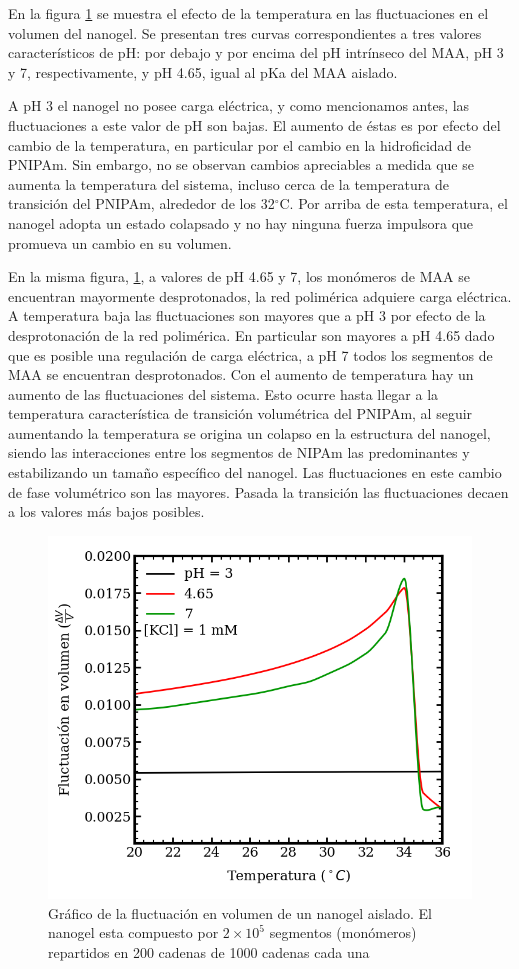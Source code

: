 	
	En la figura \ref{fig:mc:fluct-T} se muestra el efecto de la temperatura en las fluctuaciones en el volumen del nanogel. Se presentan tres curvas correspondientes a tres valores caracter\'isticos de pH: por debajo y por encima del pH intr\'inseco del MAA, pH 3 y 7, respectivamente, y pH 4.65, igual al pKa del MAA aislado.
	
	A pH 3 el nanogel no posee carga el\'ectrica, y como mencionamos antes, las fluctuaciones a este valor de pH son bajas. El aumento de \'estas es por efecto del cambio de la temperatura, en particular por el cambio en la hidroficidad de PNIPAm. Sin embargo, no se observan cambios apreciables a medida que se aumenta la temperatura del sistema, incluso cerca de la temperatura de transici\'on del PNIPAm, alrededor de los 32$^\circ$C. Por arriba de esta temperatura, el nanogel adopta un estado colapsado y no hay ninguna fuerza impulsora que promueva un cambio en su volumen.
	
	En la misma figura, \ref{fig:mc:fluct-T}, a valores de pH 4.65 y 7, los mon\'omeros de MAA se encuentran mayormente desprotonados, la red polim\'erica adquiere carga el\'ectrica. 
	A temperatura baja las fluctuaciones son mayores que a pH 3 por efecto de la desprotonaci\'on de la red polim\'erica. En particular son mayores a pH 4.65 dado que es posible una regulaci\'on de carga el\'ectrica, a pH 7 todos los segmentos de MAA se encuentran desprotonados.
	Con el aumento de temperatura hay un aumento de las fluctuaciones del sistema.
	Esto ocurre hasta llegar a la temperatura caracter\'istica de transici\'on volum\'etrica del PNIPAm, al seguir aumentando la temperatura se origina un colapso en la estructura del nanogel, siendo las interacciones entre los segmentos de NIPAm las predominantes y estabilizando un tama\~no espec\'ifico del nanogel.
	Las fluctuaciones en este cambio de fase volum\'etrico son las mayores. Pasada la transici\'on las fluctuaciones decaen a los valores m\'as bajos posibles.
	
	
	
	\begin{figure}
		\centering
		\includegraphics[width=0.45\linewidth]{Figures/graph-mc/fluct-T.png}
		\caption{Gr\'afico de la fluctuaci\'on en volumen de un nanogel aislado. El nanogel esta compuesto por $2\times 10^5$ segmentos (mon\'omeros) repartidos en 200 cadenas de 1000 cadenas cada una}
		\label{fig:mc:fluct-T}
	\end{figure}
	
